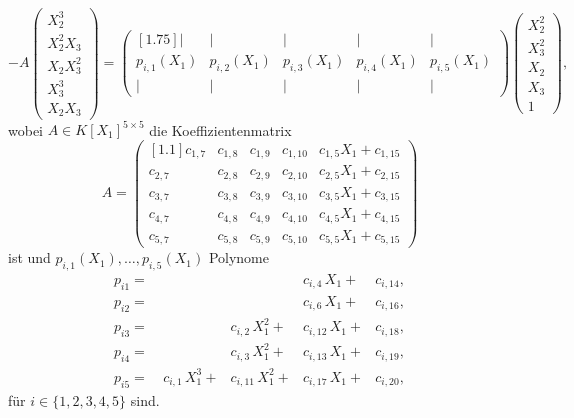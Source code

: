\documentclass[a4paper,oneside, 11pt, openany%
]{article}
\theoremstyle{custom}
\theoremstyle{custom}
\begin{document}
\begin{equation*}
	-A
	\begin{pmatrix}
		X_{2}^3\\
		X_{2}^2X_{3}\\
		X_{2}X_{3}^2\\
		X_{3}^3\\
		X_{2}X_{3}
	\end{pmatrix}
	=
	\begin{pmatrix}[1.75]
		\vert & \vert & \vert & \vert & \vert \\
		p_{i,1}(X_{1})&p_{i,2}(X_{1})& p_{i,3}(X_{1})& p_{i,4}(X_{1})& p_{i,5}(X_{1})\\
		\vert & \vert & \vert & \vert & \vert
	\end{pmatrix}
	\begin{pmatrix}
		X_{2}^2\\
		X_{3}^2\\
		X_{2}\\
		X_{3}\\
		1
	\end{pmatrix},
\end{equation*}
wobei $A \in K[X_{1}]^{5 \times 5}$ die Koeffizientenmatrix
\begin{equation}
	A = 
	\begin{pmatrix}[1.1]
		c_{1,7}& c_{1,8}& c_{1,9}& c_{1,10}& c_{1,5} X_{1} + c_{1,15}\\
		c_{2,7}& c_{2,8}& c_{2,9}& c_{2,10}& c_{2,5} X_{1} + c_{2,15}\\
		c_{3,7}& c_{3,8}& c_{3,9}& c_{3,10}& c_{3,5} X_{1} + c_{3,15}\\
		c_{4,7}& c_{4,8}& c_{4,9}& c_{4,10}& c_{4,5} X_{1} + c_{4,15}\\
		c_{5,7}& c_{5,8}& c_{5,9}& c_{5,10}& c_{5,5} X_{1} + c_{5,15}
	\end{pmatrix}
\end{equation}
ist und $p_{i,1}(X_{1}), \ldots, p_{i,5}(X_{1})$ Polynome
\begin{equation}
	\begin{alignedat}{4}
		p_{i1}= \ &&&c_{i,4}\,X_{1}+&c_{i,14},\\
		p_{i2}= \ &&&c_{i,6}\,X_{1}+&c_{i,16},\\
		p_{i3}= \ &&c_{i,2}\,X_{1}^2+&c_{i,12}\,X_{1}+&c_{i,18},\\
		p_{i4}= \ &&c_{i,3}\,X_{1}^2+&c_{i,13}\,X_{1}+&c_{i,19},\\
		p_{i5}= \ &c_{i,1}\,X_{1}^3+&c_{i,11}\,X_{1}^2+&c_{i,17}\,X_{1}+&c_{i,20},
	\end{alignedat}
\end{equation}
für $i\in \{1,2,3,4,5\}$ sind.
\end{document}
